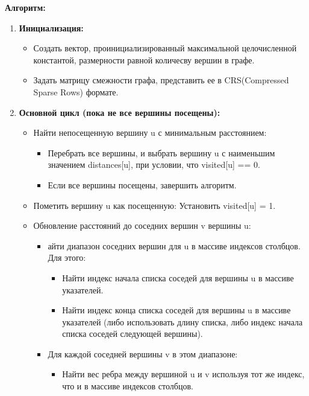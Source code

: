 \documentclass[12pt]{article}
\begin{document}
\textbf{Алгоритм:}

\begin{enumerate}
    \item \textbf{Инициализация:}
        \begin{itemize}
            \item Создать вектор, проинициализированный максимальной целочисленной константой, размерности равной количесву вершин в графе.
            \item Задать матрицу смежности графа, представить ее в CRS(Compressed Sparse Rows) формате.
        \end{itemize}
    \item \textbf{Основной цикл (пока не все вершины посещены):}
        \begin{itemize}
            \item Найти непосещенную вершину u с минимальным расстоянием:
                \begin{itemize}
                    \item Перебрать все вершины, и выбрать вершину u с наименьшим значением distances[u], при условии, что visited[u] == 0.
                    \item Если все вершины посещены, завершить алгоритм.
                \end{itemize}
            \item Пометить вершину u как посещенную: Установить visited[u] = 1.
            \item Обновление расстояний до соседних вершин v вершины u:
                \begin{itemize}
                    \item айти диапазон соседних вершин для u в массиве индексов столбцов. Для этого:
                        \begin{itemize}
                            \item Найти индекс начала списка соседей для вершины u в массиве указателей.
                            \item Найти индекс конца списка соседей для вершины u в массиве указателей (либо использовать длину списка, либо индекс начала списка соседей следующей вершины).
                        \end{itemize}
                    \item Для каждой соседней вершины v в этом диапазоне:
                        \begin{itemize}
                            \item Найти вес ребра между вершиной u и v используя тот же индекс, что и в массиве индексов столбцов.

\end{itemize}
\end{itemize}
\end{itemize}
\end{enumerate}
\end{document}
